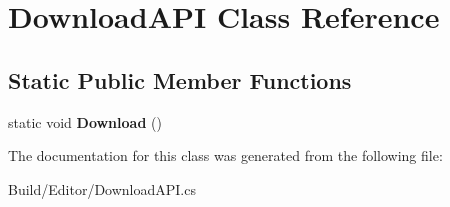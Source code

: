 \hypertarget{class_download_a_p_i}{}\section{Download\+A\+PI Class Reference}
\label{class_download_a_p_i}
\subsection*{Static Public Member Functions}
\begin{DoxyCompactItemize}
\item 
\mbox{\label{class_download_a_p_i_a2f6cd689fd805ad7d2fa293675447568}} 
static void {\bfseries Download} ()
\end{DoxyCompactItemize}


The documentation for this class was generated from the following file\+:\begin{DoxyCompactItemize}
\item 
Build/\+Editor/Download\+A\+P\+I.\+cs\end{DoxyCompactItemize}
